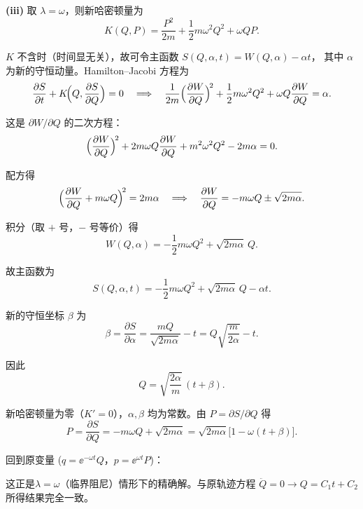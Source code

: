 \begin{question}[阻尼振子]
\begin{solution}
\textbf{(iii)} 取 $\lambda=\omega$，则新哈密顿量为
\[
K(Q,P)=\frac{P^{2}}{2m}+\frac12 m\omega^{2}Q^{2}+\omega QP.
\]

$K$ 不含时（时间显无关），故可令主函数 $S(Q,\alpha,t)=W(Q,\alpha)-\alpha t$，
其中 $\alpha$ 为新的守恒动量。Hamilton--Jacobi 方程为
\[
\frac{\partial S}{\partial t}+K\!\Bigl(Q,\frac{\partial S}{\partial Q}\Bigr)=0
\quad\Longrightarrow\quad
\frac{1}{2m}\Bigl(\frac{\partial W}{\partial Q}\Bigr)^{\!2}
+\frac12 m\omega^{2}Q^{2}+\omega Q\frac{\partial W}{\partial Q}
=\alpha.
\]

这是 $\partial W/\partial Q$ 的二次方程：
\[
\Bigl(\frac{\partial W}{\partial Q}\Bigr)^{\!2}
+2m\omega Q\frac{\partial W}{\partial Q}
+m^{2}\omega^{2}Q^{2}-2m\alpha=0.
\]

配方得
\[
\Bigl(\frac{\partial W}{\partial Q}+m\omega Q\Bigr)^{\!2}=2m\alpha
\quad\Longrightarrow\quad
\frac{\partial W}{\partial Q}=-m\omega Q\pm\sqrt{2m\alpha}.
\]

积分（取 $+$ 号，$-$ 号等价）得
\[
W(Q,\alpha)=-\frac12 m\omega Q^{2}+\sqrt{2m\alpha}\,Q.
\]

故主函数为
\[
S(Q,\alpha,t)=-\frac12 m\omega Q^{2}+\sqrt{2m\alpha}\,Q-\alpha t.
\]

新的守恒坐标 $\beta$ 为
\[
\beta=\frac{\partial S}{\partial\alpha}
=\frac{mQ}{\sqrt{2m\alpha}}-t
=Q\sqrt{\frac{m}{2\alpha}}-t.
\]

因此
\[
Q=\sqrt{\frac{2\alpha}{m}}\,(t+\beta).
\]

新哈密顿量为零（$K'=0$），$\alpha,\beta$ 均为常数。由 $P=\partial S/\partial Q$ 得
\[
P=\frac{\partial S}{\partial Q}=-m\omega Q+\sqrt{2m\alpha}
=\sqrt{2m\alpha}\bigl[1-\omega(t+\beta)\bigr].
\]

回到原变量 ($q=\ee^{-\omega t}Q$，$p=\ee^{\omega t}P$)：



这正是$\lambda=\omega$（临界阻尼）情形下的精确解。与原轨迹方程
$\ddot Q=0\to Q=C_{1}t+C_{2}$ 所得结果完全一致。

\end{solution}
\end{question}


